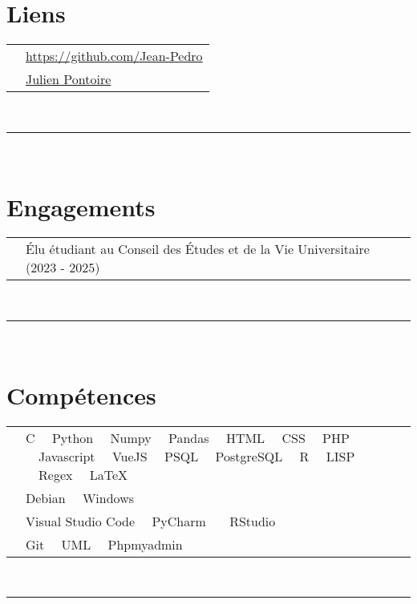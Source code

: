 \documentclass[oneside]{article}
\begin{document}
{\begin{minipage}[t][\textheight-2\fboxsep-2\fboxrule][t]{\dimexpr0.40\textwidth-2\fboxrule-2\fboxsep\relax}
        \section*{\large Liens}
        \begin{tabular}{cl}
            \faGithub{}   & \href{https://github.com/Jean-Pedro}{https://github.com/Jean-Pedro} \\
            \faLinkedin{} & \href{https://www.linkedin.com/in/julien-pontoire-0a50a42b1/}{Julien Pontoire} \\
        \end{tabular}
        \vspace{10pt} \\
        \rule{\linewidth}{0.4pt} \\

        \section*{\large Engagements}
        \begin{tabularx}{\textwidth}{cY}
            & Élu étudiant au Conseil des Études et de la Vie Universitaire (2023 - 2025)
        \end{tabularx}
        \vspace{7pt} \\
        \rule{\linewidth}{0.4pt} \\
        \section*{\large Compétences}
        \begin{tabularx}{\textwidth}{cY}
            \faCode{}        & C \ \ Python \ \ Numpy \ \ Pandas \ \ HTML \ \ CSS \ \ PHP \ \ Javascript \ \ VueJS \ \ PSQL \ \ PostgreSQL \ \ R \ \ LISP \ \ Regex \ \ LaTeX \\
            \faCogs{}        & Debian \ \ Windows \\
            \faLaptopCode{}  & Visual Studio Code \ \ PyCharm \ \ \ RStudio \\
            \faToolbox{}     & Git \ \ UML \ \ Phpmyadmin
        \end{tabularx}
        \vspace{1pt} \\
        \rule{\linewidth}{0.4pt}
        

\end{minipage}}
\end{document}
